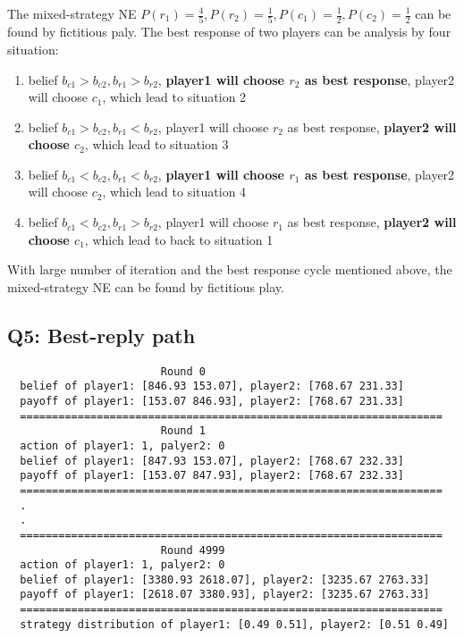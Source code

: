\documentclass[a4paper, oneside, final, 12pt]{scrartcl} %
\begin{document}
\begingroup
\raggedright
The mixed-strategy NE $P(r_1) = \frac{4}{5}, P(r_2) = \frac{1}{5}, 
P(c_1) = \frac{1}{2}, P(c_2) = \frac{1}{2}$ can be found by fictitious paly.
The best response of two players can be analysis by four situation:
\begin{enumerate}
  \item belief $b_{c1} > b_{c2}, b_{r1} > b_{r2}$, 
  \textbf{player1 will choose $r_2$ as best response}, player2 will choose $c_1$, 
  which lead to situation 2
  \item belief $b_{c1} > b_{c2}, b_{r1} < b_{r2}$,
  player1 will choose $r_2$ as best response, \textbf{player2 will choose $c_2$}, 
  which lead to situation 3
  \item belief $b_{c1} < b_{c2}, b_{r1} < b_{r2}$,
  \textbf{player1 will choose $r_1$ as best response}, player2 will choose $c_2$, 
  which lead to situation 4
  \item belief $b_{c1} < b_{c2}, b_{r1} > b_{r2}$,
  player1 will choose $r_1$ as best response, \textbf{player2 will choose $c_1$}, 
  which lead to back to situation 1
\end{enumerate}
With large number of iteration and the best response cycle mentioned above, 
the mixed-strategy NE can be found by fictitious play.
\endgroup

\subsection{Q5: Best-reply path}

\begin{lstlisting}
                        Round 0
  belief of player1: [846.93 153.07], player2: [768.67 231.33]
  payoff of player1: [153.07 846.93], player2: [768.67 231.33]
  ==================================================================
                        Round 1
  action of player1: 1, palyer2: 0
  belief of player1: [847.93 153.07], player2: [768.67 232.33]
  payoff of player1: [153.07 847.93], player2: [768.67 232.33]
  ==================================================================
  .
  .
  ==================================================================
                        Round 4999
  action of player1: 1, palyer2: 0
  belief of player1: [3380.93 2618.07], player2: [3235.67 2763.33]
  payoff of player1: [2618.07 3380.93], player2: [3235.67 2763.33]
  ==================================================================
  strategy distribution of player1: [0.49 0.51], player2: [0.51 0.49]
\end{lstlisting}
\end{document}

